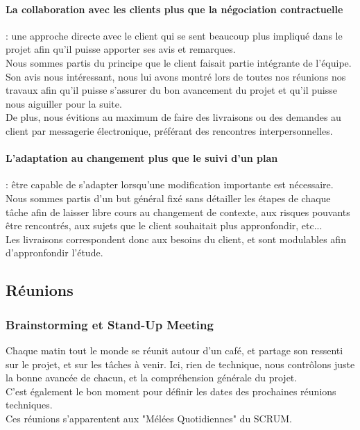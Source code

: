 \paragraph{La collaboration avec les clients plus que la négociation contractuelle} : une approche directe avec le client qui se sent beaucoup plus impliqué dans le projet afin qu’il puisse apporter ses avis et remarques.\\

Nous sommes partis du principe que le client faisait partie intégrante de l'équipe. Son avis nous intéressant, nous lui avons montré lors de toutes nos réunions nos travaux afin qu'il puisse s'assurer du bon avancement du projet et qu'il puisse nous aiguiller pour la suite.\\
De plus, nous évitions au maximum de faire des livraisons ou des demandes au client par messagerie électronique, préférant des rencontres interpersonnelles.


\paragraph{L’adaptation au changement plus que le suivi d’un plan} : être capable de s’adapter lorsqu’une modification importante est nécessaire.\\

Nous sommes partis d'un but général fixé sans détailler les étapes de chaque tâche afin de laisser libre cours au changement de contexte, aux risques pouvants être rencontrés, aux sujets que le client souhaitait plus appronfondir, etc...\\
Les livraisons correspondent donc aux besoins du client, et sont modulables afin d'appronfondir l'étude.

\subsection{Réunions}

\subsubsection{Brainstorming et Stand-Up Meeting}

Chaque matin tout le monde se réunit autour d'un café, et partage son ressenti sur le projet, et sur les tâches à venir. Ici, rien de technique, nous contrôlons juste la bonne avancée de chacun, et la compréhension générale du projet. \\
C'est également le bon moment pour définir les dates des prochaines réunions techniques.\\
Ces réunions s'apparentent aux "Mélées Quotidiennes" du SCRUM.

